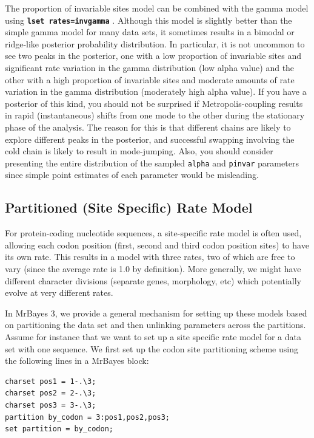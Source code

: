 \documentclass[12pt]{book}
\newcommand{\ttt}[1]{\texttt{#1} }
\newcommand{\tb}[1]{\ttt{\textbf{#1}} }
\begin{document}
The proportion of invariable sites model can be combined with the gamma model using \tb{lset
rates=invgamma}. Although this model is slightly better than the simple gamma model for many data
sets, it sometimes results in a bimodal or ridge-like posterior probability distribution. In
particular, it is not uncommon to see two peaks in the posterior, one with a low proportion of
invariable sites and significant rate variation in the gamma distribution (low alpha value) and the
other with a high proportion of invariable sites and moderate amounts of rate variation in the
gamma distribution (moderately high alpha value). If you have a posterior of this kind, you should
not be surprised if Metropolis-coupling results in rapid (instantaneous) shifts from one mode to
the other during the stationary phase of the analysis. The reason for this is that different chains
are likely to explore different peaks in the posterior, and successful swapping involving the cold
chain is likely to result in mode-jumping. Also, you should consider presenting the entire
distribution of the sampled \ttt{alpha} and \ttt{pinvar} parameters since simple point estimates of
each parameter would be misleading.

\subsection{Partitioned (Site Specific) Rate Model}
For protein-coding nucleotide sequences, a site-specific rate model is often used, allowing each
codon position (first, second and third codon position sites) to have its own rate. This results in
a model with three rates, two of which are free to vary (since the average rate is 1.0 by
definition). More generally, we might have different character divisions (separate genes,
morphology, etc) which potentially evolve at very different rates.

In MrBayes 3, we provide a general mechanism for setting up these models based on partitioning the
data set and then unlinking parameters across the partitions. Assume for instance that we want to
set up a site specific rate model for a data set with one sequence.  We first set up the codon site
partitioning scheme using the following lines in a MrBayes block:

\begin{singlespacing}
\small
\begin{verbatim}
charset pos1 = 1-.\3;
charset pos2 = 2-.\3;
charset pos3 = 3-.\3;
partition by_codon = 3:pos1,pos2,pos3;
set partition = by_codon;
\end{verbatim}
\normalsize
\end{singlespacing}
\end{document}
